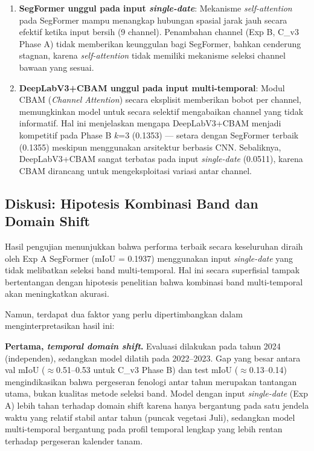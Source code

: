 \begin{enumerate}
    \item \textbf{SegFormer unggul pada input \textit{single-date}}:
    Mekanisme \textit{self-attention} pada SegFormer mampu menangkap hubungan spasial jarak
    jauh secara efektif ketika input bersih (9 channel). Penambahan channel (Exp B, C\_v3 Phase A)
    tidak memberikan keunggulan bagi SegFormer, bahkan cenderung stagnan, karena
    \textit{self-attention} tidak memiliki mekanisme seleksi channel bawaan yang sesuai.

    \item \textbf{DeepLabV3+CBAM unggul pada input multi-temporal}:
    Modul CBAM (\textit{Channel Attention}) secara eksplisit memberikan bobot per channel,
    memungkinkan model untuk secara selektif mengabaikan channel yang tidak informatif.
    Hal ini menjelaskan mengapa DeepLabV3+CBAM menjadi kompetitif pada Phase B $k$=3
    (0.1353) --- setara dengan SegFormer terbaik (0.1355) meskipun menggunakan arsitektur
    berbasis CNN.
    Sebaliknya, DeepLabV3+CBAM sangat terbatas pada input \textit{single-date} (0.0511),
    karena CBAM dirancang untuk mengeksploitasi variasi antar channel.
\end{enumerate}

\subsection{Diskusi: Hipotesis Kombinasi Band dan Domain Shift}

Hasil pengujian menunjukkan bahwa performa terbaik secara keseluruhan diraih oleh
Exp A SegFormer (mIoU = 0.1937) menggunakan input \textit{single-date} yang tidak melibatkan
seleksi band multi-temporal.
Hal ini secara superfisial tampak bertentangan dengan hipotesis penelitian bahwa kombinasi
band multi-temporal akan meningkatkan akurasi.

Namun, terdapat dua faktor yang perlu dipertimbangkan dalam menginterpretasikan hasil ini:

\textbf{Pertama, \textit{temporal domain shift}.}
Evaluasi dilakukan pada tahun 2024 (independen), sedangkan model dilatih pada 2022--2023.
Gap yang besar antara val mIoU ($\approx$0.51--0.53 untuk C\_v3 Phase B) dan test mIoU
($\approx$0.13--0.14) mengindikasikan bahwa pergeseran fenologi antar tahun merupakan
tantangan utama, bukan kualitas metode seleksi band.
Model dengan input \textit{single-date} (Exp A) lebih tahan terhadap domain shift karena
hanya bergantung pada satu jendela waktu yang relatif stabil antar tahun (puncak vegetasi Juli),
sedangkan model multi-temporal bergantung pada profil temporal lengkap yang lebih rentan
terhadap pergeseran kalender tanam.

